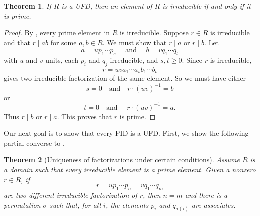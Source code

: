 \documentclass[12pt]{report}
\newtheorem{theorem}{Theorem}[chapter]
\numberwithin{equation}{section}
\numberwithin{theorem}{chapter}
\theoremstyle{definition}
\newtheorem*{basic properties}{Basic Properties}
\newtheorem*{Important Remark}{Important Remark}
\begin{document}
\begin{theorem}\label{ufd irreducible=prime}
If $R$ is a UFD, then an element of $R$ is irreducible if and only if it is prime.
\end{theorem}


\begin{proof}
By , every prime element in $R$ is irreducible. Suppose $r \in R$ is irreducible and that $r \mid a b$ for some $a, b \in R$. We must show that $r \mid a$ or $r \mid b$. Let 
$$a = u p_1 \cdots p_s \quad \text{ and } \quad b = v q_1 \cdots q_t$$ 
with $u$ and $v$ units, each $p_i$ and $q_j$ irreducible, and $s,t \geqslant 0$. 
Since $r$ is irreducible, 
$$r= uv a_1 \cdots a_s b_1 \cdots b_t$$ 
gives two irreducible factorization of the same element. So we must have either 
$$s=0 \quad \text{and} \quad r \cdot (uv)^{-1} = b$$ 
or 
$$t=0 \quad \text{and } \quad r \cdot (uv)^{-1} = a.$$ 
Thus $r \mid b$ or $r \mid a$. This proves that $r$ is prime.
\end{proof}



Our next goal is to show that every PID is a UFD. First, we show the following partial converse to .




\begin{theorem}[Uniqueness of factorizations under certain conditions]\label{uniqueness factorization under certain conditions}
Assume $R$ is a domain such that every irreducible element is a prime element.
Given a nonzero $r \in R$, if 
$$r = up_1 \cdots p_n = vq_1 \cdots q_m$$ 
are two different irreducible factorization of $r$, then $n=m$ and there is a permutation $\sigma$ such that, for all $i$, the elements $p_i$ and $q_{\sigma(i)}$ are associates.  	
\end{theorem}
\end{document}
